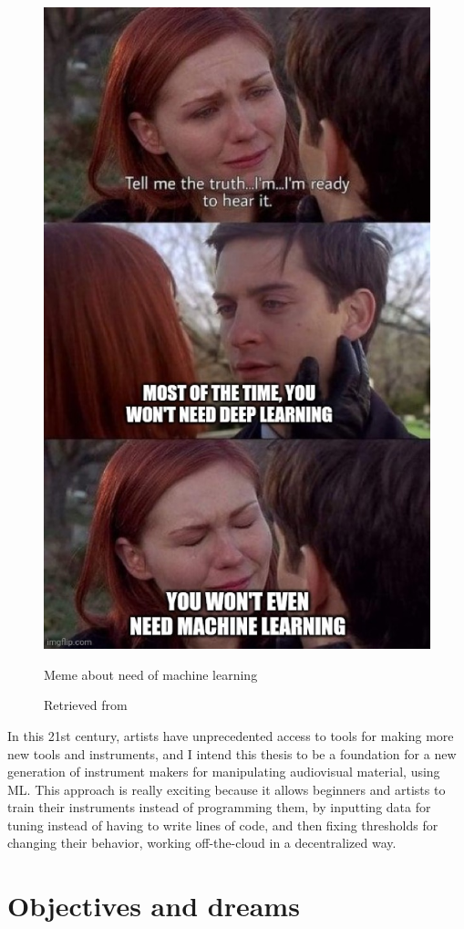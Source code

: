 \begin{figure}[ht]
  \centering
  \includegraphics[width=0.75\linewidth,height=0.50\textheight,keepaspectratio]{images/meme-spider-man.jpg}
  \caption{Meme about need of machine learning}
  \caption*{Retrieved from \cite{website-twitter-dynamicwebpaige-meme}}
  \label{fig:meme-spider-man}
\end{figure}

In this 21st century, artists have unprecedented access to tools for making more new tools and instruments, and I intend this thesis to be a foundation for a new generation of instrument makers for manipulating audiovisual material, using \acrshort{ML}. This approach is really exciting because it allows beginners and artists to train their instruments instead of programming them, by inputting data for tuning instead of having to write lines of code, and then fixing thresholds for changing their behavior, working off-the-cloud in a decentralized way.

\section{Objectives and dreams}

